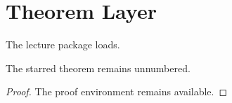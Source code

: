 \documentclass{article}
\begin{document}
\section{Theorem Layer}
\begin{theorem}The lecture package loads.\end{theorem}
\begin{theorem*}The starred theorem remains unnumbered.\end{theorem*}
\begin{proof}The proof environment remains available.\end{proof}
\end{document}
